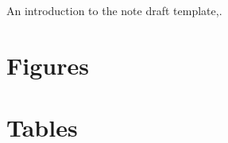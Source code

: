 An introduction to the note draft template\cite{pml1Book},\cite{pml2Book}.

\section{Figures}



\section{Tables}
